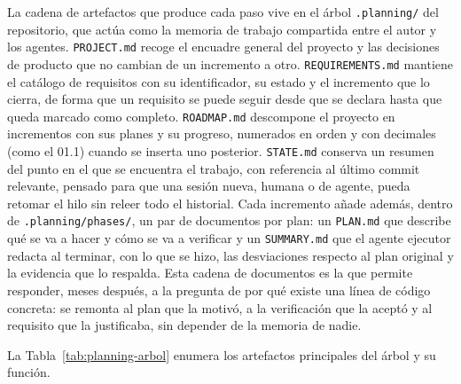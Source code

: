 La cadena de artefactos que produce cada paso vive en el árbol \texttt{.planning/} del repositorio, que actúa como
la memoria de trabajo compartida entre el autor y los agentes. \texttt{PROJECT.md} recoge el
encuadre general del proyecto y las decisiones de producto que no cambian de un incremento a otro.
\texttt{REQUIREMENTS.md} mantiene el catálogo de requisitos con su identificador, su estado y
el incremento que lo cierra, de forma que un requisito se puede seguir desde que se declara hasta que
queda marcado como completo. \texttt{ROADMAP.md} descompone el proyecto en incrementos con sus planes
y su progreso, numerados en orden y con decimales (como el 01.1) cuando se inserta uno posterior. \texttt{STATE.md} conserva un resumen del punto en el que se encuentra el
trabajo, con referencia al último commit relevante, pensado para que una sesión nueva, humana o
de agente, pueda retomar el hilo sin releer todo el historial. Cada incremento añade además, dentro de
\texttt{.planning/phases/}, un par de documentos por plan: un \texttt{PLAN.md} que describe qué
se va a hacer y cómo se va a verificar y un \texttt{SUMMARY.md} que el agente ejecutor redacta
al terminar, con lo que se hizo, las desviaciones respecto al plan original y la evidencia que
lo respalda. Esta cadena de documentos es la que permite responder, meses después, a la
pregunta de por qué existe una línea de código concreta: se remonta al plan que la motivó, a la
verificación que la aceptó y al requisito que la justificaba, sin depender de la memoria de
nadie.

La Tabla~\ref{tab:planning-arbol} enumera los artefactos principales del árbol y su función.

